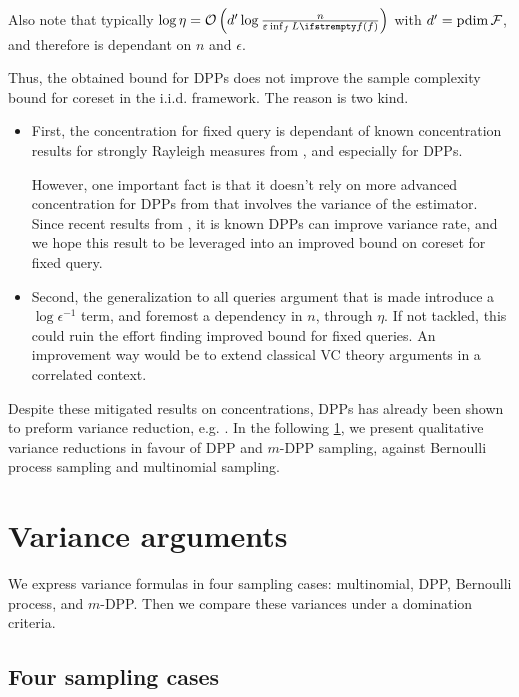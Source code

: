 Also note that typically $\log \eta = \OO\left(\pdim \log \frac{n}{\epsilon \inf_{f}\loss{f}}\right)$ with ${d'} = \operatorname{pdim}\mathcal{F}$, and therefore is dependant on $n$ and $\epsilon$.


Thus, the obtained bound for DPPs does not improve the sample complexity bound for coreset in the i.i.d. framework. The reason is two kind. 

\begin{itemize}
	\item First, the concentration for fixed query is dependant of known concentration results for strongly Rayleigh measures from \cite{pemantle2011rayleighconcentration}, and especially for DPPs. 

	However, one important fact is that it doesn't rely on more advanced concentration for DPPs from \cite{breuer2013nevai} that involves the variance of the estimator. Since recent results from \cite{bardenet2020mcdpp}, it is known DPPs can improve variance rate, and we hope this result to be leveraged into an improved bound on coreset for fixed query.
	\item Second, the generalization to all queries argument that is made introduce a $\log \epsilon^{-1}$ term, and foremost a dependency in $n$, through $\eta$. If not tackled, this could ruin the effort finding improved bound for fixed queries. An improvement way would be to extend classical VC theory arguments in a correlated context.
\end{itemize}


Despite these mitigated results on concentrations, DPPs has already been shown to preform variance reduction, e.g. \cite{bardenet2020mcdpp}.
In the following \cref{sec__variance_arguments}, we present qualitative variance reductions in favour of DPP and $m$-DPP sampling, against Bernoulli process sampling and multinomial sampling.


\section{Variance arguments}
\label{sec__variance_arguments}
We express variance formulas in four sampling cases: multinomial, DPP, Bernoulli process, and $m$-DPP. Then we compare these variances under a domination criteria.
\subsection{Four sampling cases}
\label{subsec__foursampl}
